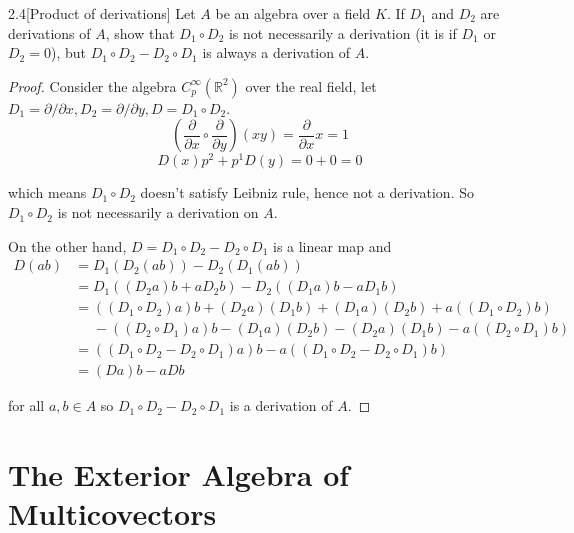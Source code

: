 \begin{problem}{2.4}[Product of derivations]
Let \( A \) be an algebra over a field \( K \). If \( D_{1} \) and \( D_{2} \) are derivations of \( A \), show that \( D_{1} \circ D_{2} \) is not necessarily a derivation (it is if \( D_{1} \) or \( D_{2} = 0 \)), but \( D_{1} \circ D_{2} - D_{2} \circ D_{1} \) is always a derivation of \( A \).
\end{problem}

\begin{proof}
    Consider the algebra \( C^{\infty}_{p}(\mathbb{R}^{2}) \) over the real field, let \( D_{1} = \partial/\partial x, D_{2} = \partial/\partial y, D = D_{1} \circ D_{2} \).
    \[
        \left(\frac{\partial}{\partial x}\circ \frac{\partial}{\partial y}\right)(xy) = \frac{\partial}{\partial x} x = 1
    \]
    \[
        D(x) p^{2} + p^{1}D(y) = 0 + 0 = 0
    \]

    which means \( D_{1} \circ D_{2} \) doesn't satisfy Leibniz rule, hence not a derivation. So \( D_{1} \circ D_{2} \) is not necessarily a derivation on \( A \).

    On the other hand, \( D = D_{1}\circ D_{2} - D_{2}\circ D_{1} \) is a linear map and
    \begin{align*}
        D(ab) & = D_{1}(D_{2}(ab)) - D_{2}(D_{1}(ab))                                                               \\
              & = D_{1}((D_{2}a)b + aD_{2}b) - D_{2}((D_{1}a)b - aD_{1}b)                                           \\
              & = ((D_{1}\circ D_{2})a)b + (D_{2}a)(D_{1}b) + (D_{1}a)(D_{2}b) + a((D_{1}\circ D_{2})b)             \\
              & \phantom{=} - ((D_{2}\circ D_{1})a)b - (D_{1}a)(D_{2}b) - (D_{2}a)(D_{1}b) - a((D_{2}\circ D_{1})b) \\
              & = ((D_{1}\circ D_{2} - D_{2}\circ D_{1})a)b - a((D_{1}\circ D_{2} - D_{2}\circ D_{1})b)             \\
              & = (Da)b - aDb
    \end{align*}

    for all \( a, b \in A \) so \( D_{1}\circ D_{2} - D_{2}\circ D_{1} \) is a derivation of \( A \).
\end{proof}

\section{The Exterior Algebra of Multicovectors}

